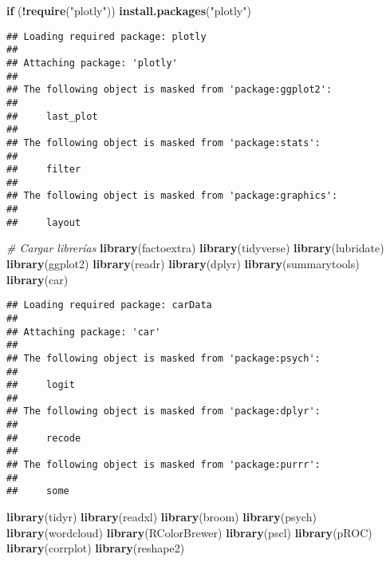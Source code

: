 \documentclass[
]{article}
\newenvironment{Shaded}{\begin{snugshade}}{\end{snugshade}}
\newcommand{\CommentTok}[1]{\textcolor[rgb]{0.56,0.35,0.01}{\textit{#1}}}
\newcommand{\ControlFlowTok}[1]{\textcolor[rgb]{0.13,0.29,0.53}{\textbf{#1}}}
\newcommand{\FunctionTok}[1]{\textcolor[rgb]{0.13,0.29,0.53}{\textbf{#1}}}
\newcommand{\NormalTok}[1]{#1}
\newcommand{\SpecialCharTok}[1]{\textcolor[rgb]{0.81,0.36,0.00}{\textbf{#1}}}
\newcommand{\StringTok}[1]{\textcolor[rgb]{0.31,0.60,0.02}{#1}}
\begin{document}
\begin{Shaded}
\begin{Highlighting}[]
\ControlFlowTok{if}\NormalTok{ (}\SpecialCharTok{!}\FunctionTok{require}\NormalTok{(}\StringTok{"plotly"}\NormalTok{)) }\FunctionTok{install.packages}\NormalTok{(}\StringTok{"plotly"}\NormalTok{)}
\end{Highlighting}
\end{Shaded}

\begin{verbatim}
## Loading required package: plotly
## 
## Attaching package: 'plotly'
## 
## The following object is masked from 'package:ggplot2':
## 
##     last_plot
## 
## The following object is masked from 'package:stats':
## 
##     filter
## 
## The following object is masked from 'package:graphics':
## 
##     layout
\end{verbatim}

\begin{Shaded}
\begin{Highlighting}[]
\CommentTok{\# Cargar librerías}
\FunctionTok{library}\NormalTok{(factoextra)}
\FunctionTok{library}\NormalTok{(tidyverse)}
\FunctionTok{library}\NormalTok{(lubridate)}
\FunctionTok{library}\NormalTok{(ggplot2)}
\FunctionTok{library}\NormalTok{(readr)}
\FunctionTok{library}\NormalTok{(dplyr)}
\FunctionTok{library}\NormalTok{(summarytools)}
\FunctionTok{library}\NormalTok{(car)}
\end{Highlighting}
\end{Shaded}

\begin{verbatim}
## Loading required package: carData
## 
## Attaching package: 'car'
## 
## The following object is masked from 'package:psych':
## 
##     logit
## 
## The following object is masked from 'package:dplyr':
## 
##     recode
## 
## The following object is masked from 'package:purrr':
## 
##     some
\end{verbatim}

\begin{Shaded}
\begin{Highlighting}[]
\FunctionTok{library}\NormalTok{(tidyr)}
\FunctionTok{library}\NormalTok{(readxl)}
\FunctionTok{library}\NormalTok{(broom)}
\FunctionTok{library}\NormalTok{(psych)}
\FunctionTok{library}\NormalTok{(wordcloud)}
\FunctionTok{library}\NormalTok{(RColorBrewer)}
\FunctionTok{library}\NormalTok{(pscl)}
\FunctionTok{library}\NormalTok{(pROC)}
\FunctionTok{library}\NormalTok{(corrplot)}
\FunctionTok{library}\NormalTok{(reshape2)}
\end{Highlighting}
\end{Shaded}
\end{document}
